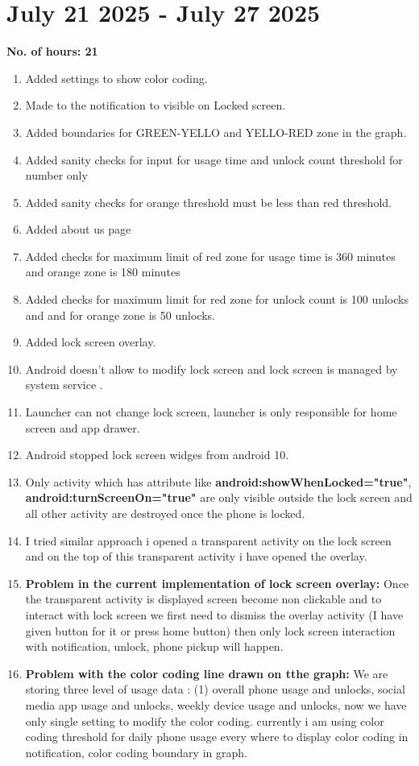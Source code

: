 \documentclass[12pt]{article}
\begin{document}
    \section{July 21 2025 - July 27 2025}
    {\bf No. of hours: 21}
    \begin{enumerate}
        \item Added settings to show color coding.
        \item Made to the notification to visible on Locked screen.
        \item Added boundaries for GREEN-YELLO and YELLO-RED zone in the graph.
        \item Added sanity checks for input for usage time and unlock count threshold for number only
        \item Added sanity checks for orange threshold must be less than red threshold.
        \item Added about us page 
        \item Added checks for maximum limit of red zone for usage time is 360 minutes and orange zone is 180 minutes 
        \item Added checks for maximum limit for red zone for unlock count is 100 unlocks and and for orange zone is 50 unlocks.
        \item Added lock screen overlay.
        \item Android doesn't allow to modify lock screen and lock screen is managed by system service .
        \item Launcher can not change lock screen, launcher is only responsible for home screen and app drawer.
        \item Android stopped lock screen widges from android 10.
        \item Only activity which has attribute like \textbf{android:showWhenLocked="true"},
        \textbf{android:turnScreenOn="true"} are only visible outside the lock screen and all other activity are destroyed once the phone is locked.
        \item I tried similar approach i opened a transparent activity on the lock screen and on the top of this transparent activity i have opened the overlay.
        \item \textbf{Problem in the current implementation of lock screen overlay:}
        Once the transparent activity is displayed screen become non clickable and to interact with lock screen we first need to dismiss the overlay activity (I have given button for it or press home button) then only lock screen interaction with notification, unlock, phone pickup will happen.
        \item \textbf{Problem with the color coding line drawn on tthe graph:} We are storing three level of usage data : (1) overall phone usage and unlocks, social media app usage and unlocks, weekly device usage and unlocks, now we have only single setting to modify the color coding. currently i am using color coding threshold for daily phone usage every where to display color coding in notification, color coding boundary in graph.
    \end{enumerate}
\end{document}
